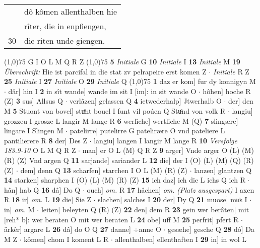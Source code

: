 \documentclass[8pt,a4paper,notitlepage]{article}
\begin{document}
\begin{table}[ht]
\begin{minipage}[t]{0.5\linewidth}
\begin{tabular}{rl}
 & dô kômen allenthalben hie\\ 
 & rîter, die in enpfiengen,\\ 
30 & die riten unde giengen.\\ 
\end{tabular}
\scriptsize
\line(1,0){75} \newline
G I O L M Q R Z \newline
\line(1,0){75} \newline
\textbf{5} \textit{Initiale} G  \textbf{10} \textit{Initiale} I  \textbf{13} \textit{Initiale} M  \textbf{19} \textit{Überschrift:} Hie ist parcifal in die stat zv pelrapeire erst komen Z   $\cdot$ \textit{Initiale} R Z  \textbf{25} \textit{Initiale} I  \textbf{27} \textit{Initiale} O  \textbf{29} \textit{Initiale} Q  \newline
\line(1,0){75} \newline
\textbf{1} daz er kom] fur dy konnigyn M  $\cdot$ dâr] hin I \textbf{2} in sît wande] wande im sit I [im]: in sit wande O  $\cdot$ hôhen] hoche R (Z) \textbf{3} sus] Allsus Q  $\cdot$ verlâzen] gelassen Q \textbf{4} ietwederhalp] Jtwerhalb O  $\cdot$ der] den M \textbf{5} Stuont von bovel] stuͤnt bouel I funt vil poúen Q Stuͦnd von volk R  $\cdot$ langiu] grozzeu I grosze L langir M lange R \textbf{6} werlîche] wertliche M (Q) \textbf{7} slingære] lingare I Slingen M  $\cdot$ patelirre] putelirre G patelirære O vnd pateliere L pantilierere R \textbf{8} der] Des Z  $\cdot$ langiu] langen I langir M lange R \textbf{10} \textit{Versfolge 183.9-10} O L M Q R Z   $\cdot$ man] er O L (M) Q R Z \textbf{9} arger] Vnde arger O (L) (M) (R) (Z) Vnd argen Q \textbf{11} sarjande] sariander L \textbf{12} die] der I (O) (L) (M) (Q) (R) (Z)  $\cdot$ dem] denn Q \textbf{13} scharfen] starchen I O L (M) (R) (Z)  $\cdot$ lanzen] glantzen Q \textbf{14} starken] sharphen I (O) (L) (M) (R) (Z) \textbf{15} ich daz] ich die L ichs Q ich R  $\cdot$ hân] hab Q \textbf{16} dâ] Do Q  $\cdot$ ouch] \textit{om.} R \textbf{17} hâchen] \textit{om.} \textit{(Platz ausgespart)} I axen R \textbf{18} ir] \textit{om.} L \textbf{19} die] Sie Z  $\cdot$ slachen] salches I \textbf{20} der] Dy Q \textbf{21} muose] muͤs I  $\cdot$ in] \textit{om.} M  $\cdot$ leiten] beleyten Q (R) (Z) \textbf{22} den] dem R \textbf{23} gein wer berâten] mit [reh* b]: wer beraten O mit wer beraten L \textbf{24} obe] uff M \textbf{25} perfrit] pfert R  $\cdot$ ärkêr] argare L \textbf{26} dâ] do O Q \textbf{27} danne] ÷anne O  $\cdot$ gesæhe] gesche Q \textbf{28} dô] Da M Z  $\cdot$ kômen] chom I koment L R  $\cdot$ allenthalben] ellenthaften I \textbf{29} in] in wol L \newline

\end{minipage}
\end{table}
\end{document}
